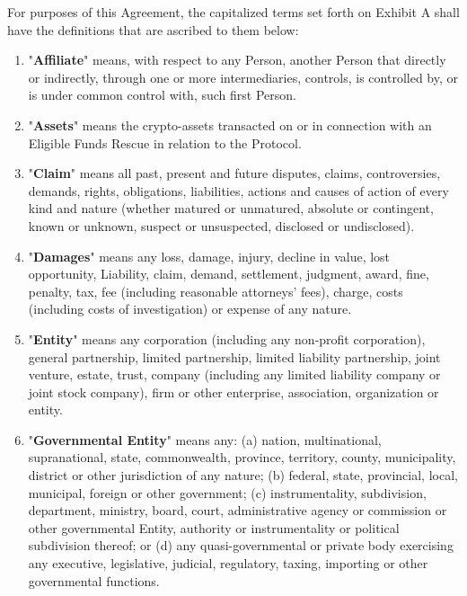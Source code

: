For purposes of this Agreement, the capitalized terms set forth on Exhibit A shall have the definitions that are ascribed to them below:

\begin{enumerate}[label=\Alph*.]
    \item "\textbf{Affiliate}" means, with respect to any Person, another Person that directly or indirectly, through one or more intermediaries, controls, is controlled by, or is under common control with, such first Person.

    \item "\textbf{Assets}" means the crypto-assets transacted on or in connection with an Eligible Funds Rescue in relation to the Protocol.

    \item "\textbf{Claim}" means all past, present and future disputes, claims, controversies, demands, rights, obligations, liabilities, actions and causes of action of every kind and nature (whether matured or unmatured, absolute or contingent, known or unknown, suspect or unsuspected, disclosed or undisclosed).

    \item "\textbf{Damages}" means any loss, damage, injury, decline in value, lost opportunity, Liability, claim, demand, settlement, judgment, award, fine, penalty, tax, fee (including reasonable attorneys' fees), charge, costs (including costs of investigation) or expense of any nature.

    \item "\textbf{Entity}" means any corporation (including any non-profit corporation), general partnership, limited partnership, limited liability partnership, joint venture, estate, trust, company (including any limited liability company or joint stock company), firm or other enterprise, association, organization or entity.

    \item "\textbf{Governmental Entity}" means any: (a) nation, multinational, supranational, state, commonwealth, province, territory, county, municipality, district or other jurisdiction of any nature; (b) federal, state, provincial, local, municipal, foreign or other government; (c) instrumentality, subdivision, department, ministry, board, court, administrative agency or commission or other governmental Entity, authority or instrumentality or political subdivision thereof; or (d) any quasi-governmental or private body exercising any executive, legislative, judicial, regulatory, taxing, importing or other governmental functions.


\end{enumerate}

